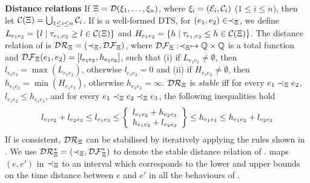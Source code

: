 {\bf Distance relations} If $\Xi=\mathcal{D}(\xi_1,\dots,\xi_n)$, where
$\xi_i=(\mathcal{E}_i,\mathcal{C}_i)$ ($1\leq i \leq n$), then let
$\mathcal{C}(\Xi)=\bigcup_{1\leq i \leq n}\mathcal{C}_i$.
  If \DScenario{} is a well-formed DTS, for
  $(e_1,e_2) \in \prec_{\Xi}$, we define
$L_{e_1e_2} = \{l\;|\;\tau_{e_1,e_2}\geq l \in \mathcal{C}(\Xi)\}$
and
$H_{e_1e_2} = \{h\;|\;\tau_{e_1,e_2}\leq h \in \mathcal{C}(\Xi)\}$.
The distance relation of \DScenario{}
is $\mathcal{DR}_{\Xi}=(\prec_{\Xi},\mathcal{DF}_{\Xi})$,
where
 $\mathcal{DF}_{\Xi}: \prec_{\Xi} \mapsto  \mathbb{Q}\times  \mathbb{Q}$ is a
  total function and
$\mathcal{DF}_{\Xi}(e_1,e_2)=[l_{e_1e_2},h_{e_1e_2}]$, such that
(i) if $L_{e_1e_2} \neq \emptyset$, then
$l_{e_1e_2}= \max(L_{e_1e_2})$,
otherwise $l_{e_1e_2}=0$ and
(ii) if $H_{e_1e_2} \neq \emptyset$, then
$h_{e_1e_2}= \min(H_{e_1e_2})$,
otherwise $h_{e_1e_2}=\infty$.
    $\mathcal{DR}_{\Xi}$ is
   \emph{stable} iff for every $e_1\prec_{\Xi} e_2$, $l_{e_1e_2} \leq
   h_{e_1e_2}$, and for every $e_1\prec_{\Xi} e_2\prec_{\Xi}e_3$, the
   following inequalities hold
\setlength\abovedisplayskip{2pt}
\setlength\belowdisplayskip{2pt}
\begin{equation}
  \label{golden2}
  l_{e_1e_2}+ l_{e_2e_3} \leq l_{e_1e_3} \leq
  \left\{
  \begin{array}{l}
    l_{e_1e_2}+ h_{e_2e_3}\\
    h_{e_1e_2}+ l_{e_2e_3}
  \end{array}
  \right \}
  \leq h_{e_1e_3} \leq h_{e_1e_2}+ l_{e_2e_3}
\end{equation}
\noindent
If \DScenario{} is consistent, $\mathcal{DR}_{\Xi}$ can be
stabilised by iteratively applying the rules shown in .
We use $\mathcal{DR}_{\Xi}^s=(\prec_{\Xi},\mathcal{DF}_{\Xi}^{s})$ to denote
the stable distance relation of \DScenario{}.
\DFS{\DScenario} maps $(e,e')$ in
$\prec_{\Xi}$ to an interval
which corresponds to the
lower and upper bounds on the time distance between $e$ and
$e'$ in all the behaviours of \DScenario.
